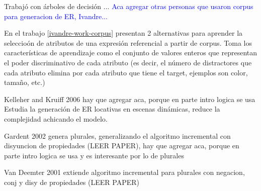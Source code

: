 Trabaj\'o con \'arboles de decisi\'on ...
\textcolor{blue}{Aca agregar otras personas que usaron corpus para generacion de ER, Ivandre... }

En el trabajo \ref{ivandre-work-corpus} presentan 2 alternativas para aprender la seleccio\'on de atributos de una expresi\'on referencial a partir de corpus. Toma los caracter\'isticas de aprendizaje como el conjunto de valores enteros que representan el poder discriminativo de cada atributo (es decir, el n\'umero de distractores que cada atributo elimina por cada atributo que tiene el target, ejemplos son color, tama\~no, etc.) 


Kelleher and Kruiff 2006  hay que agregar aca, porque en parte intro logica se usa
Estudia la generaci\'on de ER locativas en escenas din\'amicas, reduce la complejidad achicando el modelo.


Gardent 2002 genera plurales, generalizando el algoritmo incremental con disyuncion de propiedades (LEER PAPER), hay que agregar aca, porque en parte intro logica se usa y es interesante por lo de plurales

Van Deemter 2001 extiende algoritmo incremental para plurales con negacion, conj y disy de propiedades (LEER PAPER)




